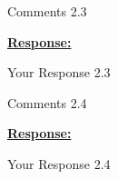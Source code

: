 \vspace{0.3cm}


\begin{cmt}{}{}

Comments 2.3

\end{cmt}
\vspace{0.1cm}
\noindent
\underline{\textbf{Response:}}
\vspace{0.2cm}

Your Response 2.3

\vspace{0.3cm}


\begin{cmt}{}{}

Comments 2.4

\end{cmt}
\vspace{0.1cm}
\noindent
\underline{\textbf{Response:}}
\vspace{0.2cm}

Your Response 2.4

\vspace{0.3cm}

